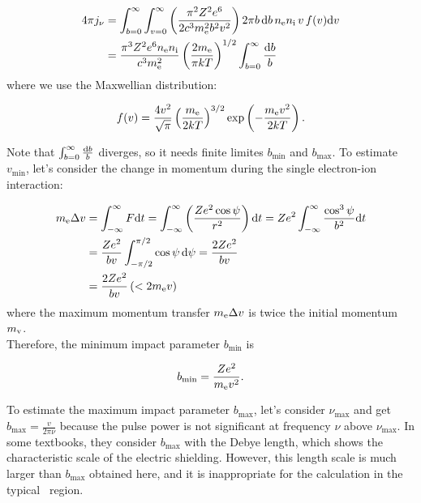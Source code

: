 \begin{align}
    4 \pi j_{\nu} &= \int_{b=0}^{\infty} \int_{v=0}^{\infty} \left(\frac{\pi^2 Z^2 e^6}{2 c^3 m_{\mathrm{e}}^2 b^2 v^2}\right) 2 \pi b\,\mathrm{d} b\,n_{\mathrm{e}} n_{\mathrm{i}}\,v\,f(v) \mathrm{d} v \label{eq:essential_radio4n30}\\
                  &=\frac{\pi^{3} Z^{2} e^{6} n_{\mathrm{e}} n_{\mathrm{i}}}{c^{3} m_{\mathrm{e}}^{2}} \left(\frac{2m_{\mathrm{e}}}{\pi k T}\right)^{1/2}\int_{b=0}^{\infty} \frac{\mathrm{d} b}{b}\label{eq:essential_radio4n31}
\end{align}
where we use the Maxwellian distribution:

\begin{equation}\label{eq:essential_radio4n34}
    f(v)=\frac{4 v^2}{\sqrt{\pi}} \left(\frac{m_{\mathrm{e}}}{2 k T}\right)^{3/2} \exp \left(-\frac{m_{\mathrm{e}} v^2}{2 k T}\right).
\end{equation}

Note that $\int^{\infty}_{b=0} \frac{\mathrm{d} b}{b}$ diverges, so it needs finite limites $b_{\min}$ and $b_{\max}$.
To estimate $v_{\min}$, let's consider the change in momentum during the single electron-ion interaction:

\begin{align}\label{eq:essential_radio4n40}
    m_{\mathrm{e}} \Delta v &= \int_{-\infty}^{\infty} F \mathrm{d} t = \int_{-\infty}^{\infty}\left(\frac{Z e^{2} \cos \psi}{r^{2}}\right) \mathrm{d} t=Z e^{2} \int_{-\infty}^{\infty} \frac{\cos ^{3} \psi}{b^{2}} \mathrm{d} t \\
                      &= \frac{Z e^{2}}{b v} \int_{-\pi / 2}^{\pi / 2} \cos \psi\,\mathrm{d} \psi=\frac{2 Z e^{2}}{b v} \\
                      &= \frac{2Ze^2}{bv} \left(< 2m_{\mathrm{e}}v\right)
\end{align}
where the maximum momentum transfer $m_{\mathrm{e}} \Delta v$ is twice the initial momentum $m_{\mathrm{v}}$. \\

Therefore, the minimum impact parameter $b_{\min}$ is

\begin{equation}\label{eq:essential_radio4n43}
    b_{\min} = \frac{Ze^2}{m_{\mathrm{e}}v^2}.
\end{equation}

To estimate the maximum impact parameter $b_{\max}$, let's consider $\nu_{\max}$ and get $b_{\max} = \frac{v}{2\pi \nu}$ because the pulse power is not significant at frequency $\nu$ above $\nu_{\max}$.
In some textbooks, they consider $b_{\max}$ with the Debye length, which shows the characteristic scale of the electric shielding.
However, this length scale is much larger than $b_{\max}$ obtained here, and it is inappropriate for the calculation in the typical \ih~region.

